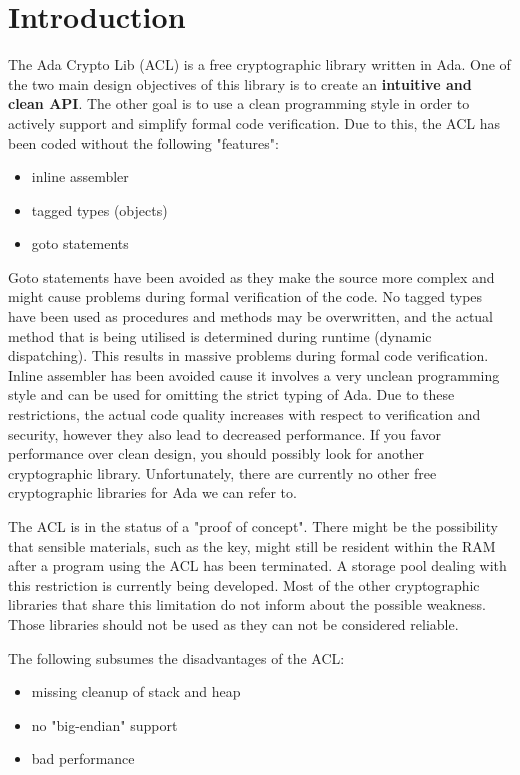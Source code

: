 \chapter{Introduction}
The Ada Crypto Lib (ACL) is a free cryptographic library written in Ada.
One of the two main design objectives of this library is to create
an \textbf{intuitive and clean API}. The other goal is to use a clean
programming style in order to actively support and simplify formal code
verification. Due to this, the ACL has been coded without the
following "features":
\begin{itemize}
\item inline assembler
\item tagged types (objects)
\item goto statements
\end{itemize}

Goto statements have been avoided as they make the source more complex
and might cause problems during formal verification of the code. No
tagged types have been used as procedures and methods may be
overwritten, and the actual method that is being utilised is
determined during runtime (dynamic dispatching). This results in
massive problems during formal code verification. Inline assembler has
been avoided cause it involves a very unclean programming style and
can be used for omitting the strict typing of Ada. Due to these
restrictions, the actual code quality increases with respect to
verification and security, however they also lead to decreased
performance.  If you favor performance over clean design, you should
possibly look for another cryptographic library. Unfortunately, there
are currently no other free cryptographic libraries for Ada we can
refer to.

The ACL is in the status of a "proof of concept". There might be the
possibility that sensible materials, such as the key, might still be
resident within the RAM after a program using the ACL has been
terminated. A storage pool dealing with this restriction is currently
being developed. Most of the other cryptographic libraries that share
this limitation do not inform about the possible weakness. Those
libraries should not be used as they can not be considered reliable.

The following subsumes the disadvantages of the ACL:
\begin{itemize}
\item missing cleanup of stack and heap
\item no "big-endian" support
\item bad performance
\end{itemize}

